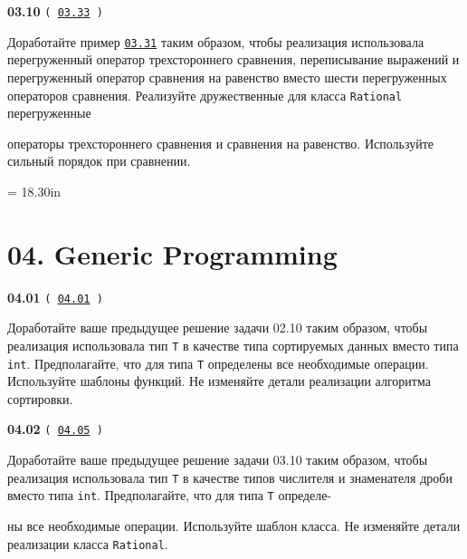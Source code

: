\documentclass[a4paper,12pt]{article}
\begin{document}
\bigskip

{\large \textbf{03.10} \texttt{(\,\href{https://github.com/i-s-m-mipt/Education/blob/master/projects/examples/source/03.33.cpp}{03.33}\,)}}

\bigskip

Доработайте пример \href{https://github.com/i-s-m-mipt/Education/blob/master/projects/examples/source/03.31.cpp}{\texttt{03.31}} таким образом, чтобы реализация использовала перегруженный оператор трехстороннего сравнения, переписывание выражений и перегруженный оператор сравнения на равенство вместо шести перегруженных операторов сравнения. Реализуйте дружественные для класса \lstinline{Rational} перегруженные 

операторы трехстороннего сравнения и сравнения на равенство. Используйте сильный порядок при сравнении.



\newpage\thispagestyle{empty}\pdfpageheight = 18.30in\enlargethispage{100in}

\section{04. Generic Programming}

{\large \textbf{04.01} \texttt{(\,\href{https://github.com/i-s-m-mipt/Education/blob/master/projects/examples/source/04.01.cpp}{04.01}\,)}}

\bigskip

Доработайте ваше предыдущее решение задачи 02.10 таким образом, чтобы реализация использовала тип \lstinline{T} в качестве типа сортируемых данных вместо типа \lstinline{int}. Предполагайте, что для типа \lstinline{T} определены все необходимые операции. Используйте шаблоны функций. Не изменяйте детали реализации алгоритма сортировки.

\bigskip

{\large \textbf{04.02} \texttt{(\,\href{https://github.com/i-s-m-mipt/Education/blob/master/projects/examples/source/04.05.cpp}{04.05}\,)}}

\bigskip

Доработайте ваше предыдущее решение задачи 03.10 таким образом, чтобы реализация использовала тип \lstinline{T} в качестве типов числителя и знаменателя дроби вместо типа \lstinline{int}. Предполагайте, что для типа \lstinline{T} определе-

ны все необходимые операции. Используйте шаблон класса. Не изменяйте детали реализации класса \lstinline{Rational}.
\end{document}

